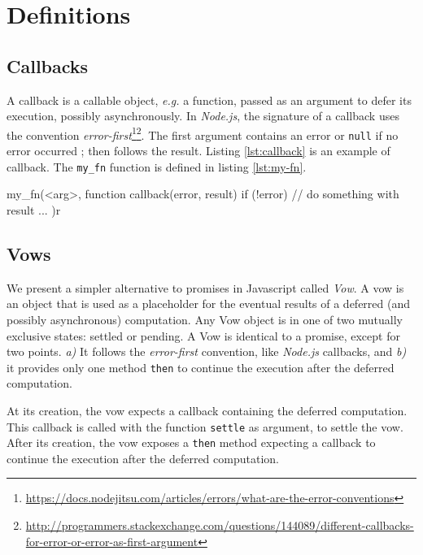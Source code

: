 \section{Definitions}

\subsection{Callbacks} \label{section:definitions:callback}

A callback is a callable object, \textit{e.g.} a function, passed as an argument to defer its execution, possibly asynchronously.
In \textit{Node.js}, the signature of a callback uses the convention \textit{error-first}\footnote{\url{https://docs.nodejitsu.com/articles/errors/what-are-the-error-conventions}}\footnote{\url{http://programmers.stackexchange.com/questions/144089/different-callbacks-for-error-or-error-as-first-argument}}.
The first argument contains an error or \texttt{null} if no error occurred ; then follows the result.
Listing \ref{lst:callback} is an example of callback.
The \texttt{my_fn} function is defined in listing \ref{lst:my-fn}.

\begin{code}[js, %
             caption={Example of a callback}, %
             label={lst:callback}] %
my_fn(<arg>, function callback(error, result) {
  if (!error) {
    // do something with result ...
  }
})r
\end{code}

\subsection{Vows} \label{section:definitions:vow}

We present a simpler alternative to promises in Javascript called \textit{Vow}.
A vow is an object that is used as a placeholder for the eventual results of a deferred (and possibly asynchronous) computation.
Any Vow object is in one of two mutually exclusive states: settled or pending.
A Vow is identical to a promise, except for two points.
\textit{a)} It follows the \textit{error-first} convention, like \textit{Node.js} callbacks, and \textit{b)} it provides only one method \texttt{then} to continue the execution after the deferred computation.

At its creation, the vow expects a callback containing the deferred computation.
This callback is called with the function \texttt{settle} as argument, to settle the vow.
After its creation, the vow exposes a \texttt{then} method expecting a callback to continue the execution after the deferred computation.


